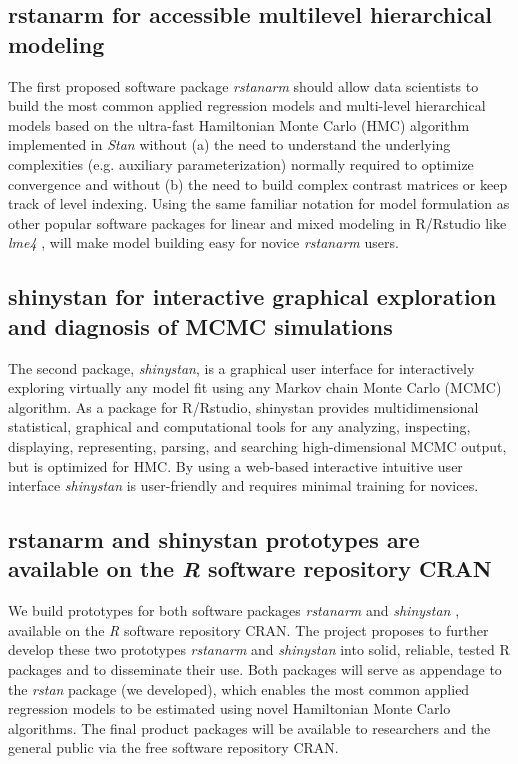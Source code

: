 \documentclass[11pt,notitlepage]{article}
\begin{document}
\subsection*{rstanarm for accessible multilevel hierarchical modeling}
The first proposed software package \textit{rstanarm} should allow data scientists to build the most common applied regression models and multi-level hierarchical models based on the ultra-fast Hamiltonian Monte Carlo (HMC) algorithm implemented in \textit{Stan} without (a) the need to understand the underlying complexities (e.g. auxiliary parameterization) normally required to optimize convergence and without (b) the need to build complex contrast matrices  or keep track of level indexing. Using the same familiar notation for model formulation as other popular software packages for linear and mixed modeling in R/Rstudio like \textit{lme4} \cite{lme4}, will make model building easy for novice \textit{rstanarm} users. 

\subsection*{shinystan for interactive graphical exploration and diagnosis of MCMC simulations}  
The second package, \textit{shinystan}, is a graphical user interface for interactively exploring virtually any model fit using any Markov chain Monte Carlo (MCMC) algorithm. As a package for R/Rstudio, shinystan  provides multidimensional statistical, graphical and computational tools for any analyzing, inspecting, displaying, representing, parsing, and searching high-dimensional MCMC output, but is optimized for HMC. By using a web-based interactive intuitive user interface \textit{shinystan} is user-friendly and requires minimal training for novices.

\subsection*{rstanarm and shinystan prototypes are available on the \textit{R} software repository CRAN}
We build prototypes for both software packages \textit{rstanarm} \cite{rstanarm} and \textit{shinystan} \cite{shinystan, Team2015}, available on the \textit{R} software repository CRAN. The project proposes to further develop these two prototypes \textit{rstanarm} and \textit{shinystan} into solid, reliable, tested R packages and to disseminate their use. Both packages will serve as appendage to the \textit{rstan} package (we developed), which enables the most common applied regression models to be estimated using novel Hamiltonian Monte Carlo algorithms. The final product packages will be available to researchers and the general public via the free software repository CRAN. 
\end{document}
